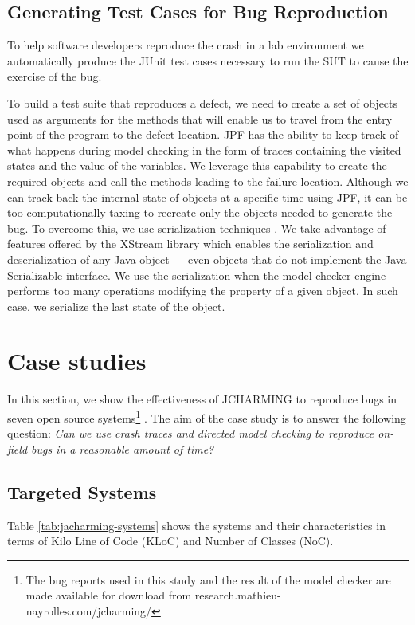 \documentclass[times]{smrauth}
\begin{document}
\subsection{Generating Test Cases for Bug Reproduction}

To help software developers reproduce the crash in a lab
environment we automatically produce the JUnit test cases
necessary to run the SUT to cause the exercise of the bug.

To build a test suite that reproduces a defect, we need to create
a set of objects used as arguments for the methods that will
enable us to travel from the entry point of the program to the
defect location. JPF has the ability to keep track of what
happens during model checking in the form of traces
containing the visited states and the value of the variables. We
leverage this capability to create the required objects and call
the methods leading to the failure location. Although we can
track back the internal state of objects at a specific time using
JPF, it can be too computationally taxing to recreate only the
objects needed to generate the bug. To overcome this, we use
serialization techniques \cite{Opyrchal1999}. We take advantage of features
offered by the XStream \cite{Xstream2011} library which enables the
serialization and deserialization of any Java object — even
objects that do not implement the Java Serializable interface.
We use the serialization when the model checker engine
performs too many operations modifying the property of a
given object. In such case, we serialize the last state of the
object.

\section{Case studies}

In this section, we show the effectiveness of JCHARMING to
reproduce bugs in seven open source systems\footnote{The bug reports used in this study and the result of the model checker are
made available for download from research.mathieu-
nayrolles.com/jcharming/} . The aim of the
case study is to answer the following question: {\it Can we use
crash traces and directed model checking to reproduce on-
field bugs in a reasonable amount of time?}

\subsection{Targeted Systems}

Table \ref{tab:jacharming-systems} shows the systems and their characteristics in terms of
Kilo Line of Code (KLoC) and Number of Classes (NoC).
\end{document}
